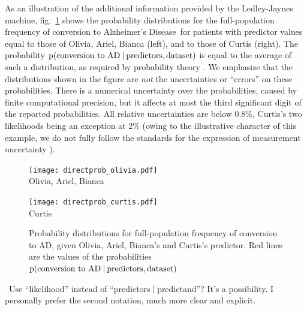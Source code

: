 \documentclass[utf8]{FrontiersinHarvard} %
\newcommand*{\puzzle}{{\fontencoding{U}\fontfamily{fontawesometwo}\selectfont\symbol{225}}}
\newcommand{\mynotez}[1]{{\color{notecolour}\puzzle\ #1}}
\newcommand*{\sects}{\S\S}%
\newcommand*{\fig}{fig.}%
\newcommand*{\eg}{{e.g.}}
\newcommand*{\p}{\mathrm{p}}%
\renewcommand*{\|}[1][]{\nonscript\:#1\vert\nonscript\:\mathopen{}}
\newcommand*{\ad}{Alzheimer's Disease}
\newcommand*{\ljm}{Ledley-Jaynes machine}
\begin{document}
\medskip

As an illustration of the additional information provided by the \ljm, \fig~\ref{fig:freq_distribution_patients} shows the probability distributions for the full-population frequency of conversion to \ad\ for patients with predictor values equal to those of Olivia, Ariel, Bianca (left), and to those of Curtis (right). The probability $\p(\text{conversion to AD} \| \text{predictors}, \text{dataset})$ is equal to the average of such a distribution, as required by probability theory \citep[\eg][\sects~4.2--4.3]{bernardoetal1994_r2000}. We emphasize that the distributions shown in the figure are \emph{not} the uncertainties or \enquote{errors} on these probabilities. There is a numerical uncertainty over the probabilities, caused by finite computational precision, but it affects at most the third significant digit of the reported probabilities. All relative uncertainties are below 0.8\%, Curtis's two likelihoods being an exception at 2\% (owing to the illustrative character of this example, we do not fully follow the standards for the expression of measurement uncertainty \citep{jcgm1993_r2008}).

\begin{figure}[t]%
  \centering%
  \begin{minipage}{0.49\linewidth}\centering
    \texttt{[image: directprob\_olivia.pdf]}\\
    \footnotesize Olivia, Ariel, Bianca
  \end{minipage}
  \hfill
  \begin{minipage}{0.49\linewidth}\centering
    \texttt{[image: directprob\_curtis.pdf]}\\
    \footnotesize Curtis
  \end{minipage}
  \caption{Probability distributions for full-population frequency of conversion to AD, given Olivia, Ariel, Bianca's and Curtis's predictor. Red lines are the values of the probabilities  $\p(\text{conversion to AD} \| \text{predictors}, \text{dataset})$}\label{fig:freq_distribution_patients}
\end{figure}%



\mynotez{Use \enquote{likelihood} instead of \enquote{predictors$\|$predictand}? It's a possibility. I personally prefer the second notation, much more clear and explicit.}



\end{document}

